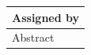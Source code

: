 \documentclass{article}
\begin{document}
\begin{table}[]
\begin{tabular}{|l|l|l|}
\multicolumn{3}{|l|}{Assigned by}                                                                                                                                                                                                                                    \\ \hline
\multicolumn{3}{|l|}{\multirow{5}{*}{Abstract}}                                                                                                                                                                                                                      \\
\multicolumn{3}{|l|}{}                                                                                                                                                                                                                                               \\
\multicolumn{3}{|l|}{}                                                                                                                                                                                                                                               \\
\multicolumn{3}{|l|}{}                                                                                                                                                                                                                                               \\
\multicolumn{3}{|l|}{}                                                                                                                                                                                                                                               \\ \hline
\end{tabular}
\end{table}
\clearpage

\doublespacing
\tableofcontents
\pagebreak 
\setcounter{page}{1}
\rhead{\thepage}
\end{document}
